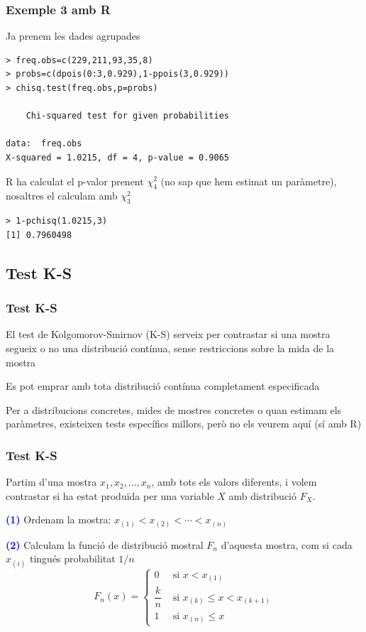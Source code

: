 \documentclass[12pt,t]{beamer}
\newcommand{\blue}[1]{\textcolor{blue}{#1}}
\renewcommand{\emph}[1]{{\color{red}#1}}
\renewcommand{\leq}{\leqslant}
\theoremstyle{plain}
\theoremstyle{definition}
\begin{document}
\begin{frame}[fragile]
\frametitle{Exemple 3 amb R}
Ja prenem les dades agrupades

\begin{verbatim}
> freq.obs=c(229,211,93,35,8)
> probs=c(dpois(0:3,0.929),1-ppois(3,0.929))
> chisq.test(freq.obs,p=probs)

	Chi-squared test for given probabilities

data:  freq.obs 
X-squared = 1.0215, df = 4, p-value = 0.9065
\end{verbatim}
 R ha calculat el p-valor prenent $\chi_4^2$ (no sap que hem estimat un paràmetre), nosaltres el calculam amb $\chi_3^2$
\begin{verbatim}
> 1-pchisq(1.0215,3)
[1] 0.7960498
\end{verbatim}
\end{frame}

\subsection{Test K-S}

\begin{frame}
\frametitle{Test K-S}
El \emph{test de Kolgomorov-Smirnov} (K-S) serveix per contrastar si una mostra segueix o no una distribució contínua, sense restriccions sobre la mida de la mostra
\medskip

Es pot emprar amb tota distribució contínua completament especificada
\medskip

Per a distribucions concretes, mides de mostres concretes o quan estimam els paràmetres, existeixen tests específics millors, però no els veurem aquí (sí amb R)
\end{frame}

\begin{frame}
\frametitle{Test K-S}

Partim d'una mostra $x_1,x_2,\ldots,x_n$, \emph{amb tots els valors  diferents}, i volem contrastar si ha estat produïda per una variable $X$ amb distribució $F_X$.
\medskip

\blue{\bf (1)} Ordenam la mostra: $x_{(1)}< x_{(2)}<\cdots< x_{(n)}$
\bigskip

\blue{\bf (2)} Calculam la \emph{funció de distribució mostral} $F_{n}$
d'aquesta mostra, com si cada $x_{(i)}$ tingués probabilitat $1/n$
$$
F_n(x)=\left\{\begin{array}{ll}
0 &\mbox{ si } x< x_{(1)} \\
\dfrac{k}{n}&\mbox{ si } x_{(k)}\leq x < x_{(k+1)}\\[2ex]
1 & \mbox{ si } x_{(n)} \leq x
\end{array}
\right.
$$


\end{frame}
\end{document}
